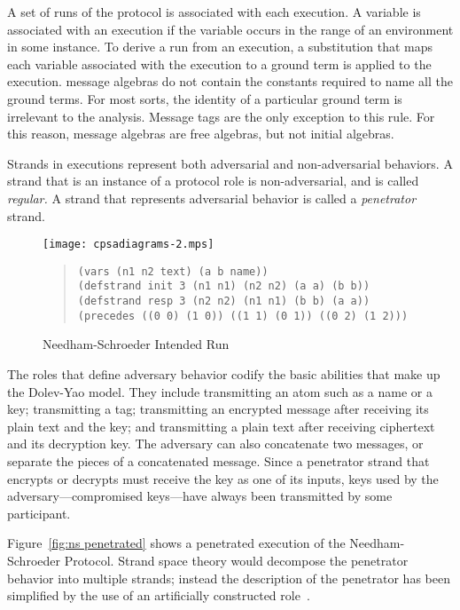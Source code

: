 \documentclass[12pt]{article}
\begin{document}
A set of runs of the protocol is associated with each execution.  A
variable is associated with an execution if the variable occurs in the
range of an environment in some instance.  To derive a run from an
execution, a substitution that maps each variable associated with the
execution to a ground term is applied to the execution.  {\cpsa}
message algebras do not contain the constants required to name all the
ground terms.  For most sorts, the identity of a particular ground
term is irrelevant to the analysis.  Message tags are the only
exception to this rule.  For this reason, {\cpsa} message algebras are
free algebras, but not initial algebras.

Strands in executions represent both adversarial and non-adversarial
behaviors.  A strand that is an instance of a protocol role is
non-adversarial, and is called \emph{regular.}  A
strand that represents adversarial behavior is called a
\emph{penetrator} strand.

\begin{figure}
\begin{center}
\texttt{[image: cpsadiagrams-2.mps]}
\end{center}
\begin{quote}
\begin{verbatim}
(vars (n1 n2 text) (a b name))
(defstrand init 3 (n1 n1) (n2 n2) (a a) (b b))
(defstrand resp 3 (n2 n2) (n1 n1) (b b) (a a))
(precedes ((0 0) (1 0)) ((1 1) (0 1)) ((0 2) (1 2)))
\end{verbatim}
\end{quote}
\caption{Needham-Schroeder Intended Run}
\label{fig:ns intended}
\end{figure}

The roles that define adversary behavior codify the basic abilities
that make up the Dolev-Yao model.  They include transmitting an atom
such as a name or a key; transmitting a tag; transmitting an encrypted
message after receiving its plain text and the key; and transmitting a
plain text after receiving ciphertext and its decryption key.  The
adversary can also concatenate two messages, or separate the pieces of
a concatenated message.  Since a penetrator strand that encrypts or
decrypts must receive the key as one of its inputs, keys used by the
adversary---compromised keys---have always been transmitted by some
participant.

Figure~\ref{fig:ns penetrated} shows a penetrated execution of the
Needham-Schroeder Protocol.  Strand space theory would decompose the
penetrator behavior into multiple strands; instead the description of
the penetrator has been simplified by the use of an artificially
constructed role~.
\end{document}
